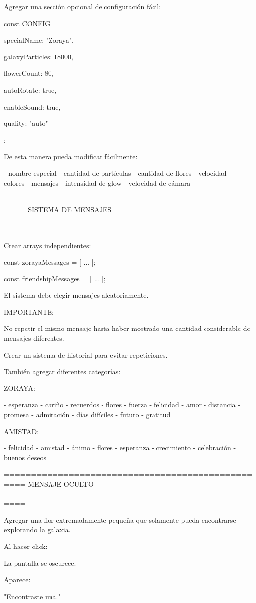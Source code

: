 Agregar una sección opcional de configuración fácil:

const CONFIG = {

    specialName: "Zoraya",

    galaxyParticles: 18000,

    flowerCount: 80,

    autoRotate: true,

    enableSound: true,

    quality: "auto"

};

De esta manera pueda modificar fácilmente:

- nombre especial
- cantidad de partículas
- cantidad de flores
- velocidad
- colores
- mensajes
- intensidad de glow
- velocidad de cámara

==================================================
SISTEMA DE MENSAJES
==================================================

Crear arrays independientes:

const zorayaMessages = [
   ...
];

const friendshipMessages = [
   ...
];

El sistema debe elegir mensajes aleatoriamente.

IMPORTANTE:

No repetir el mismo mensaje hasta haber mostrado una cantidad considerable de mensajes diferentes.

Crear un sistema de historial para evitar repeticiones.

También agregar diferentes categorías:

ZORAYA:

- esperanza
- cariño
- recuerdos
- flores
- fuerza
- felicidad
- amor
- distancia
- promesa
- admiración
- días difíciles
- futuro
- gratitud

AMISTAD:

- felicidad
- amistad
- ánimo
- flores
- esperanza
- crecimiento
- celebración
- buenos deseos

==================================================
MENSAJE OCULTO
==================================================

Agregar una flor extremadamente pequeña que solamente pueda encontrarse explorando la galaxia.

Al hacer click:

La pantalla se oscurece.

Aparece:

"Encontraste una."

